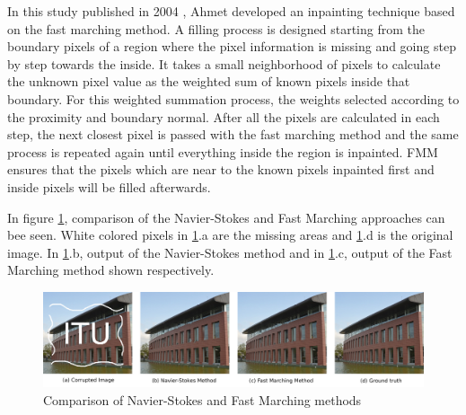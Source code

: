 In this study published in 2004 \cite{telea}, Ahmet developed an inpainting technique based on the fast marching method. A filling process is designed starting from the boundary pixels of a region where the pixel information is missing and going step by step towards the inside. It takes a small neighborhood of pixels to calculate the unknown pixel value as the weighted sum of known pixels inside that boundary. For this weighted summation process, the weights selected according to the proximity and boundary normal. After all the pixels are calculated in each step, the next closest pixel is passed with the fast marching method and the same process is repeated again until everything inside the region is inpainted. FMM ensures that the pixels which are near to the known pixels inpainted first and inside pixels will be filled afterwards.

In figure \ref{fig:traditional_comparison}, comparison of the Navier-Stokes and Fast Marching approaches can bee seen. White colored pixels in \ref{fig:traditional_comparison}.a are the missing areas and \ref{fig:traditional_comparison}.d is the original image. In \ref{fig:traditional_comparison}.b, output of the Navier-Stokes method and in \ref{fig:traditional_comparison}.c, output of the Fast Marching method shown respectively.

\begin{figure}[h]
    \centering
    \includegraphics[width=14cm]{figures/chapter2/traditional_comparison.png}
    \caption{Comparison of Navier-Stokes and Fast Marching methods}
    \label{fig:traditional_comparison}
\end{figure}
